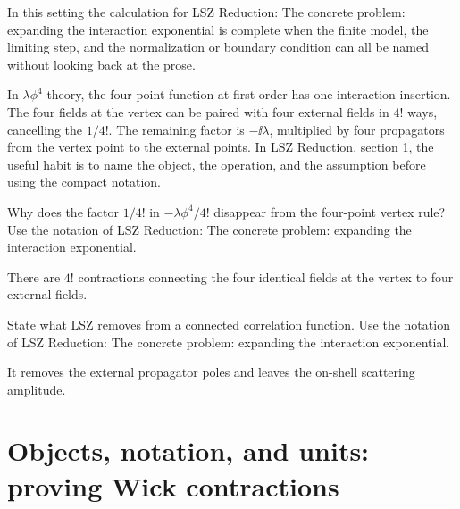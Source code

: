 In this setting the calculation for LSZ Reduction: The concrete problem: expanding the interaction exponential is complete when the finite model, the limiting step, and the normalization or boundary condition can all be named without looking back at the prose.




\begin{example}
In \(\lambda\phi^4\) theory, the four-point function at first order has one interaction insertion.  The four fields at the vertex can be paired with four external fields in \(4!\) ways, cancelling the \(1/4!\).  The remaining factor is \(-\ii\lambda\), multiplied by four propagators from the vertex point to the external points.  In LSZ Reduction, section 1, the useful habit is to name the object, the operation, and the assumption before using the compact notation.
\end{example}



\begin{exercise}
Why does the factor \(1/4!\) in \(-\lambda\phi^4/4!\) disappear from the four-point vertex rule?  Use the notation of LSZ Reduction: The concrete problem: expanding the interaction exponential.
\begin{answer}
There are \(4!\) contractions connecting the four identical fields at the vertex to four external fields.
\end{answer}
\end{exercise}

\begin{exercise}
State what LSZ removes from a connected correlation function.  Use the notation of LSZ Reduction: The concrete problem: expanding the interaction exponential.
\begin{answer}
It removes the external propagator poles and leaves the on-shell scattering amplitude.
\end{answer}
\end{exercise}



\section{Objects, notation, and units: proving Wick contractions}













